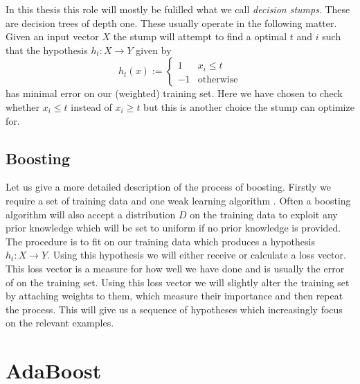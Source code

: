 \par In this thesis this role will mostly be fulilled what we call \textit{decision stumps}. These are decision trees of depth one. These usually operate in the following matter. Given an input vector $X$ the stump will attempt to find a optimal $t$ and $i$ such that the hypothesis $h_t:X\to Y$ given by $$h_t(x):=\begin{cases}1 &x_i\leq t \\ -1 &\text{otherwise}\end{cases}$$ has minimal error on our (weighted) training set. Here we have chosen to check whether $x_i\leq t$ instead of $x_i\geq t$ but this is another choice the stump can optimize for. 

\subsection{Boosting}
\label{subsec:boost}

Let us give a more detailed description of the process of boosting. Firstly we require a set of training data and one weak learning algorithm \weak. Often a boosting algorithm will also accept a distribution $D$ on the training data to exploit any prior knowledge which will be set to uniform if no prior knowledge is provided. The procedure is to fit \weak on our training data which produces a hypothesis $h_t:X\to Y$. Using this hypothesis we will either receive or calculate a loss vector. This loss vector is a measure for how well we have done and is usually the error of \weak on the training set. Using this loss vector we will slightly alter the training set by attaching weights to them, which measure their importance and then repeat the process. This will give us a sequence of hypotheses which increasingly focus on the relevant examples. 

\section{AdaBoost}
\label{sec:ada}
